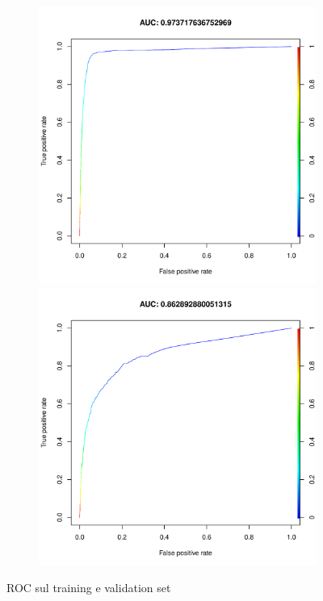 \begin{figure}[H]
	\centering
	\begin{subfigure}[t]{1\textwidth}
		\begin{minipage}[t]{0.475\textwidth}
			\includegraphics[width=\textwidth]{images/ml/random_forest/HoldoutRF/auc_train}
		\end{minipage}
		\hfill
		\begin{minipage}[t]{0.475\textwidth}
			\includegraphics[width=\textwidth]{images/ml/random_forest/HoldoutRF/auc_test}
		\end{minipage}
	\end{subfigure}
	\caption{ROC sul training e validation set}
	\label{fig:rf_h_roc}
\end{figure}


